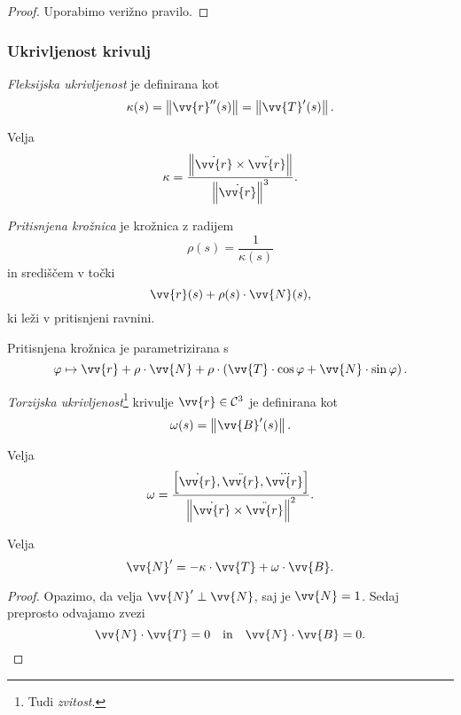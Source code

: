 \begin{proof}
Uporabimo verižno pravilo.
\end{proof}

\subsubsection{Ukrivljenost krivulj}


\begin{definicija}
\emph{Fleksijska ukrivljenost}
je definirana kot
\[
\kappa(s) = \norm{\vv{r}''(s)} = \norm{\vv{T}'(s)}.
\]
\end{definicija}

\begin{opomba}
Velja
\[
\kappa = \frac{\norm{\dot{\vv{r}} \times \ddot{\vv{r}}}}{\norm{\dot{\vv{r}}}^3}.
\]
\end{opomba}

\begin{definicija}
\emph{Pritisnjena krožnica} je
krožnica z radijem
\[
\rho(s) = \frac{1}{\kappa(s)}
\]
in središčem v točki
\[
\vv{r}(s) + \rho(s) \cdot \vv{N}(s),
\]
ki leži v pritisnjeni ravnini.
\end{definicija}

\begin{opomba}
Pritisnjena krožnica je parametrizirana s
\[
\varphi \mapsto \vv{r} + \rho \cdot \vv{N} + \rho \cdot
\left(\vv{T} \cdot \cos \varphi + \vv{N} \cdot \sin \varphi\right).
\]
\end{opomba}

\begin{definicija}
\emph{Torzijska ukrivljenost}\footnote{Tudi \emph{zvitost}.}
krivulje $\vv{r} \in \mathcal{C}^3$ je definirana kot
\[
\omega(s) = \norm{\vv{B}'(s)}.
\]
\end{definicija}

\begin{opomba}
Velja
\[
\omega =
\frac{\left[\dot{\vv{r}},\ddot{\vv{r}},\dddot{\vv{r}}\right]}
{\norm{\dot{\vv{r}} \times \ddot{\vv{r}}}^2}.
\]
\end{opomba}

\begin{trditev}
Velja
\[
\vv{N}' = - \kappa \cdot \vv{T} + \omega \cdot \vv{B}.
\]
\end{trditev}

\begin{proof}
Opazimo, da velja $\vv{N}' \perp \vv{N}$, saj je $\vv{N} = 1$.
Sedaj preprosto odvajamo zvezi
\[
\vv{N} \cdot \vv{T} = 0
\quad \text{in} \quad
\vv{N} \cdot \vv{B} = 0. \qedhere
\]
\end{proof}

